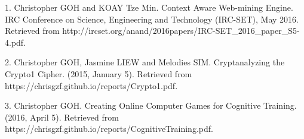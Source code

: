 

\begin{cvpubs}

  \cvpub
    {1.} %
    {Christopher GOH and KOAY Tze Min. Context Aware Web-mining Engine. IRC Conference on Science, Engineering and Technology (IRC-SET), May 2016. Retrieved from http://ircset.org/anand/2016papers/IRC-SET\_2016\_paper\_S5-4.pdf.} %

  \cvpub
    {2.} %
    {Christopher GOH, Jasmine LIEW and Melodies SIM. Cryptanalyzing the Crypto1 Cipher.
(2015, January 5). Retrieved from https://chrisgzf.github.io/reports/Crypto1.pdf.} %

  \cvpub
    {3.} %
    {Christopher GOH. Creating Online Computer Games for Cognitive Training. (2016, April
5). Retrieved from https://chrisgzf.github.io/reports/CognitiveTraining.pdf.} %

\end{cvpubs}
